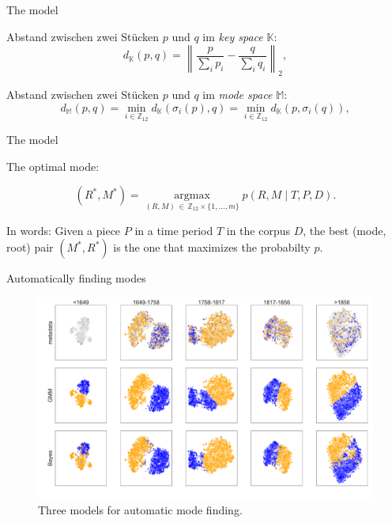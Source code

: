 \begin{frame}{The model}

    Abstand zwischen zwei Stücken $p$ und $q$ im \emph{key space} $\mathbb K$:
    \begin{equation}
        d_{\mathbb K} (p,q) = \left\| \frac{p}{\sum_i p_i} - \frac{q}{\sum_i q_i} \right\|_2,
    \end{equation}

    \pause

    Abstand zwischen zwei Stücken $p$ und $q$ im \emph{mode space} $\mathbb M$:
    \begin{equation}
        d_\mathbb M (p,q) =
        \min_{i\in\mathbb Z_{12}} d_{\mathbb K}(\sigma_i(p), q) = \min_{i\in\mathbb Z_{12}} d_{\mathbb K}(p, \sigma_{i}(q)),
    \end{equation}
\end{frame}

\begin{frame}{The model}

    The optimal mode:

    \begin{equation}\label{map_key}
        (R^*,M^*)= \operatorname*{argmax}_{(R,M)\,\in\,\mathbb Z_{12}\times\{1, \ldots, m\}} p(R,M\mid T,P,D).
    \end{equation}
    
    In words: Given a piece $P$ in a time period $T$ in the corpus $D$, the best (mode, root) pair $(M^*, R^*)$ is the one
    that maximizes the probabilty $p$.
\end{frame}

\begin{frame}{Automatically finding modes}
    \begin{figure}
        \centering
        \includegraphics[width=\linewidth,height=.8\textheight,keepaspectratio]{img/Figure4.pdf}
        \caption{Three models for automatic mode finding.}
    \end{figure}
\end{frame}

